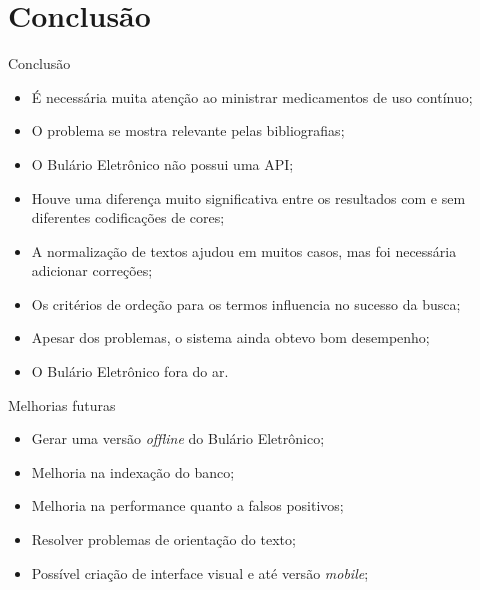 \section{Conclusão}
\begin{frame}{Conclusão}
	\begin{itemize}
		\item É necessária muita atenção ao ministrar medicamentos de uso contínuo;
		\item O problema se mostra relevante pelas bibliografias;
		\item O Bulário Eletrônico não possui uma API;
		\item Houve uma diferença muito significativa entre os resultados com e sem diferentes codificações de cores;
		\item A normalização de textos ajudou em muitos casos, mas foi necessária adicionar correções;
		\item Os critérios de ordeção para os termos influencia no sucesso da busca;
		\item Apesar dos problemas, o sistema ainda obtevo bom desempenho;
		\item O Bulário Eletrônico fora do ar.
	\end{itemize}
\end{frame}

\begin{frame}{Melhorias futuras}
	\begin{itemize}
		\item Gerar uma versão \textit{offline} do Bulário Eletrônico;
		\item Melhoria na indexação do banco;
		\item Melhoria na performance quanto a falsos positivos;
		\item Resolver problemas de orientação do texto;
		\item Possível criação de interface visual e até versão \textit{mobile};
	\end{itemize}
\end{frame}